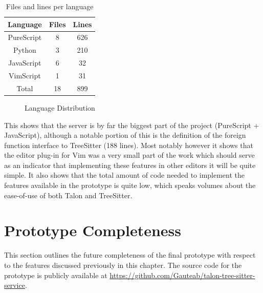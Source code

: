 \documentclass[../thesis.tex]{subfiles}
\begin{document}
\begin{table}[htpb]
    \centering
    \begin{tabular}{|c|c|c|}
        \hline
        Language&Files&Lines\\
        \hline
        PureScript&8&626\\
        Python&3&210\\
        JavaScript&6&32\\
        VimScript&1&31\\
        \hline
        Total&18&899\\
        \hline
    \end{tabular}
    \caption{Files and lines per language}
    \label{tab:stats}
\end{table}


\begin{figure}[htpb]
    \centering
    
    \caption{Language Distribution}%
    \label{fig:lang_dist}
\end{figure}

This shows that the server is by far the biggest part of the project (PureScript + JavaScript),
although a notable portion of this is the definition of the foreign function interface to TreeSitter (188 lines).
Most notably however it shows that the editor plug-in for Vim was a very small part of the work
which should serve as an indicator that implementing these features in other editors
it will be quite simple.
It also shows that the total amount of code needed to implement the features available in the prototype
is quite low, which speaks volumes about the ease-of-use of both Talon and TreeSitter.


\section{Prototype Completeness}%
\label{sec:prototype_completeness}
This section outlines the future completeness of the final prototype with respect to
the features discussed previously in this chapter.
The source code for the prototype is publicly available at \url{https://github.com/Gauteab/talon-tree-sitter-service}.
\end{document}
